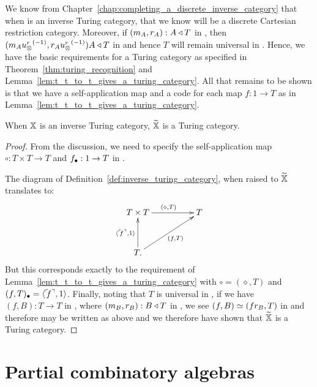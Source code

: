We know from Chapter~\ref{chap:completing_a_discrete_inverse_category} that when \X is an inverse
Turing category, that we know \Xt will be a discrete Cartesian restriction category. Moreover, if
$(m_A,r_A):A\triangleleft T$ in \X, then $(m_A{u_{\otimes}^r}^{(-1)},r_A{u_{\otimes}^r}^{(-1)})A \triangleleft T$ in \Xt and hence $T$
will remain universal in \Xt. Hence, we have the basic requirements for a Turing category as
specified in Theorem~\ref{thm:turing_recognition} and
Lemma~\ref{lem:t_t_to_t_gives_a_turing_category}. All that remains to be shown is that we have a
self-application map and a code for each map $f:1\to T$ as in Lemma~\ref{lem:t_t_to_t_gives_a_turing_category}.
\begin{theorem}\label{thm:inverse_turing_category_gives_a_turing_category}
  When $\mathbb{X}$ is an inverse Turing category, $\widetilde{\mathbb{X}}$ is a Turing category.
\end{theorem}
\begin{proof}
  From the discussion, we need to specify the self-application map $\circ:T\times T \to T$ and
  $f_{\bullet}:1 \to T$ in \Xt.

  The diagram of Definition~\ref{def:inverse_turing_category}, when raised to $\widetilde{\mathbb{X}}$
  translates to:
  \[
    \xymatrix@C+25pt@R+10pt{
      T \times T \ar[r]^{(\diamond, T)} &T \\
      T. \ar[u]^{\<\iname{f},1\>} \ar[ur]_{(f, T)}
    }
  \]
  But this corresponds exactly to the requirement of
  Lemma~\ref{lem:t_t_to_t_gives_a_turing_category} with $\circ = (\diamond,T)$ and $(f,T)_{\bullet} =
  \langle{}^\ulcorner\!\!f^\urcorner,1\rangle$.  Finally, noting that $T$ is universal in \X, if we have $(f,B):T\to T$ in \Xt,
  where $(m_B,r_B):B\triangleleft T$ in \X, we see $(f,B) \overset{\scriptscriptstyle }{\simeq} (fr_B,T)$ in \X and therefore may be
  written as above and we therefore have shown that $\widetilde{\mathbb{X}}$ is a Turing category.
\end{proof}

\section{Partial combinatory algebras}
\label{sec:partial_combinatory_algebras}

